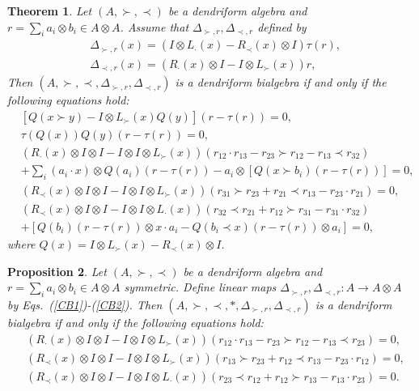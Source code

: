 \documentclass[12pt]{amsart}
\newtheorem{thm}{Theorem}[section]
\newtheorem{pro}[thm]{Proposition}
\theoremstyle{definition}
\begin{document}
\begin{thm} \label{Cg1} Let $(A,\succ,\prec)$ be a dendriform algebra and 
$r=\sum_{i}a_i\otimes b_i\in A\otimes A$. Assume that
$\Delta_{\succ,r},\Delta_{\prec,r}$ defined by 
\begin{align}&\label{CB1}
\Delta_{\succ,r}(x)=(I\otimes L_{\cdot}(x)-R_{\prec}(x)\otimes I)\tau(r),
\\&\label{CB2}\Delta_{\prec,r}(x)=(R_{\cdot}(x)\otimes I-I\otimes L_{\succ}(x))r,
\end{align}
Then $(A,\succ,\prec,\Delta_{\succ,r},\Delta_{\prec,r})$ is a dendriform bialgebra if and only if the following equations hold:
\begin{align}\label{Pa1}&[Q(x\succ y)-I\otimes L_{\succ}(x)Q(y)](r-\tau(r))=0,\\&
\label{Pa2}\tau(Q(x))Q(y)(r-\tau(r))=0,\\&
\label{Pa3}(R_{\cdot}(x)\otimes I \otimes I-I \otimes I\otimes L_{\succ}(x))(r_{12}\cdot r_{13}-r_{23}\succ r_{12}-r_{13}\prec r_{32})
\\&+\sum_{i}(a_i\cdot x)\otimes Q(a_i)(r-\tau(r))-a_i\otimes[Q(x\succ b_i)(r-\tau(r))]=0,\nonumber\\&
\label{Pa4}(R_{\prec}(x)\otimes I \otimes I-I \otimes I\otimes L_{\succ}(x))(r_{31}\succ r_{23}+r_{21}\prec r_{13}-r_{23}\cdot r_{21})=0,
\\&
\label{Pa5}(R_{\prec}(x)\otimes I \otimes I-I \otimes I\otimes L_{\cdot}(x))(r_{32}\prec r_{21}+r_{12}\succ r_{31}-r_{31}\cdot r_{32})
\\&+[Q(b_i)(r-\tau(r))\otimes x\cdot a_i-Q( b_i\prec x)(r-\tau(r))\otimes a_i]=0,\nonumber\end{align}
where $Q(x)=I\otimes L_{\succ}(x)-R_{\prec}(x)\otimes I$.
\end{thm}

\begin{pro} \label{Cg2}
Let $(A,\succ,\prec)$ be a dendriform algebra and $r=\sum\limits_{i}a_{i}\otimes b_{i}\in A\otimes A$ symmetric.
Define linear maps $\Delta_{\succ,r},\Delta_{\prec,r}:A\longrightarrow A\otimes A$ 
by Eqs.~(\ref{CB1})-(\ref{CB2}).
Then $(A, \succ,\prec,\ast,\Delta_{\succ,r},\Delta_{\prec,r})$ 
 is a dendriform bialgebra if and only if
  the following equations hold:
\begin{align}\label{Dy1}&
(R_{\cdot}(x)\otimes I \otimes I-I \otimes I\otimes L_{\succ}(x))(r_{12}\cdot r_{13}-r_{23}\succ r_{12}-r_{13}\prec r_{23})=0,\\&
\label{Dy2}(R_{\prec}(x)\otimes I \otimes I-I \otimes I\otimes L_{\succ}(x))(r_{13}\succ r_{23}+r_{12}\prec r_{13}-r_{23}\cdot r_{12})=0,
\\&
\label{Dy3}(R_{\prec}(x)\otimes I \otimes I-I \otimes I\otimes L_{\cdot}(x))(r_{23}\prec r_{12}+r_{12}\succ r_{13}-r_{13}\cdot r_{23})
=0.\end{align}
\end{pro}
\end{document}

